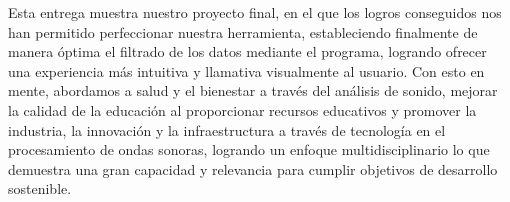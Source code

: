 \documentclass[letterpaper, 12pt]{article}
\begin{document}
Esta entrega muestra nuestro proyecto final, en el que los
logros conseguidos nos han permitido perfeccionar nuestra
herramienta, estableciendo finalmente de manera óptima el
filtrado de los datos mediante el programa, logrando
ofrecer una experiencia más intuitiva y llamativa
visualmente al usuario. Con esto en mente, abordamos a
salud y el bienestar a través del análisis de sonido,
mejorar la calidad de la educación al proporcionar recursos
educativos y promover la industria, la innovación y la
infraestructura a través de tecnología en el procesamiento
de ondas sonoras, logrando un enfoque multidisciplinario lo
que demuestra una gran capacidad y relevancia para cumplir
objetivos de desarrollo sostenible.

\nocite{source_code}

\printbibliography
\end{document}
